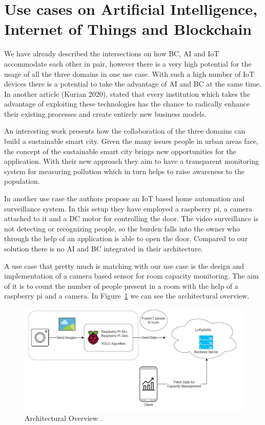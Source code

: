  
 
 
 \section{Use cases on Artificial Intelligence, Internet of Things and Blockchain}
 
 We have already described the intersections on how BC, AI and IoT accommodate each other in pair, however there is a very high potential for the usage of all the three domains in one use case. With such a high number of IoT devices there is a potential to take the advantage of AI and BC at the same time. In another article (Kurian 2020)\cite{oracle}, stated that every institution  which takes the advantage of exploiting these technologies has the chance to radically enhance their existing processes and create entirely new business models. 
 
An interesting work \cite{smartcity}  presents how the collaboration of the three domains can build a sustainable smart city. Given the many issues people in urban areas face, the concept of the sustainable smart city brings new opportunities for the application. With their new approach they aim to have a transparent monitoring system for measuring pollution which in turn helps to raise awareness to the population. 

In another use case \cite{refhomeauto} the authors propose an IoT based home automation and surveillance system. In this setup they have employed a raspberry pi, a camera attached to it and a DC motor for controlling the door. The video surveillance is not detecting or recognizing people, so the burden falls into the owner who through the help of an application is able to open the door. Compared to our solution there is no AI and BC integrated in their architecture. 


A use case that pretty much is matching with our use case is the design and implementation of a camera based sensor for room capacity monitoring. The aim of it is to count the number of people present in a room with the help of a raspberry pi and a camera. In Figure~\ref{fig:raum} we can see the architectural overview. 

\begin{figure}[!htb]
    \centering
    \includegraphics[width=1\textwidth]{figures/raumbelegung.png}
    \caption{Architectural Overview \cite{raumbelegung}.}
    \label{fig:raum}
\end{figure}

